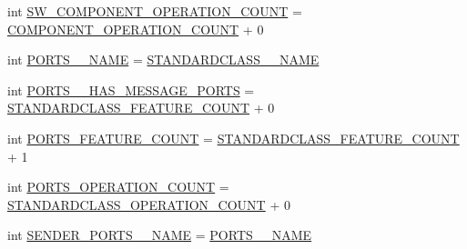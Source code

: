 \begin{DoxyCompactItemize}
\item 
int \hyperlink{interfaceshootingmachineemfmodel_1_1_shootingmachineemfmodel_package_a9aa427e39341f11b62684dd213391b4b}{S\-W\-\_\-\-C\-O\-M\-P\-O\-N\-E\-N\-T\-\_\-\-O\-P\-E\-R\-A\-T\-I\-O\-N\-\_\-\-C\-O\-U\-N\-T} = \hyperlink{interfaceshootingmachineemfmodel_1_1_shootingmachineemfmodel_package_acec1e36886a6e79a88055810db488d36}{C\-O\-M\-P\-O\-N\-E\-N\-T\-\_\-\-O\-P\-E\-R\-A\-T\-I\-O\-N\-\_\-\-C\-O\-U\-N\-T} + 0
\item 
int \hyperlink{interfaceshootingmachineemfmodel_1_1_shootingmachineemfmodel_package_a19c316778a7ed9961757b257c512945a}{P\-O\-R\-T\-S\-\_\-\-\_\-\-N\-A\-M\-E} = \hyperlink{interfaceshootingmachineemfmodel_1_1_shootingmachineemfmodel_package_a06475d7d54d52ee19b2aaf4d5d73c738}{S\-T\-A\-N\-D\-A\-R\-D\-C\-L\-A\-S\-S\-\_\-\-\_\-\-N\-A\-M\-E}
\item 
int \hyperlink{interfaceshootingmachineemfmodel_1_1_shootingmachineemfmodel_package_abfa26d954e44f83dadd22a364a5ede44}{P\-O\-R\-T\-S\-\_\-\-\_\-\-H\-A\-S\-\_\-\-M\-E\-S\-S\-A\-G\-E\-\_\-\-P\-O\-R\-T\-S} = \hyperlink{interfaceshootingmachineemfmodel_1_1_shootingmachineemfmodel_package_a14037f66989b3107e402142df96ee9aa}{S\-T\-A\-N\-D\-A\-R\-D\-C\-L\-A\-S\-S\-\_\-\-F\-E\-A\-T\-U\-R\-E\-\_\-\-C\-O\-U\-N\-T} + 0
\item 
int \hyperlink{interfaceshootingmachineemfmodel_1_1_shootingmachineemfmodel_package_a1ea63d8ed0fd32dbb04f8c83812629eb}{P\-O\-R\-T\-S\-\_\-\-F\-E\-A\-T\-U\-R\-E\-\_\-\-C\-O\-U\-N\-T} = \hyperlink{interfaceshootingmachineemfmodel_1_1_shootingmachineemfmodel_package_a14037f66989b3107e402142df96ee9aa}{S\-T\-A\-N\-D\-A\-R\-D\-C\-L\-A\-S\-S\-\_\-\-F\-E\-A\-T\-U\-R\-E\-\_\-\-C\-O\-U\-N\-T} + 1
\item 
int \hyperlink{interfaceshootingmachineemfmodel_1_1_shootingmachineemfmodel_package_a566f821cfd14b88ba5e0b60e966fb9f3}{P\-O\-R\-T\-S\-\_\-\-O\-P\-E\-R\-A\-T\-I\-O\-N\-\_\-\-C\-O\-U\-N\-T} = \hyperlink{interfaceshootingmachineemfmodel_1_1_shootingmachineemfmodel_package_a2fe5d848cfe0a02fe5609e2c5ed7e7c7}{S\-T\-A\-N\-D\-A\-R\-D\-C\-L\-A\-S\-S\-\_\-\-O\-P\-E\-R\-A\-T\-I\-O\-N\-\_\-\-C\-O\-U\-N\-T} + 0
\item 
int \hyperlink{interfaceshootingmachineemfmodel_1_1_shootingmachineemfmodel_package_a399a22f7885ad9687ceee392efd75115}{S\-E\-N\-D\-E\-R\-\_\-\-P\-O\-R\-T\-S\-\_\-\-\_\-\-N\-A\-M\-E} = \hyperlink{interfaceshootingmachineemfmodel_1_1_shootingmachineemfmodel_package_a19c316778a7ed9961757b257c512945a}{P\-O\-R\-T\-S\-\_\-\-\_\-\-N\-A\-M\-E}
\item 

\end{DoxyCompactItemize}
